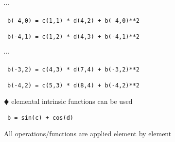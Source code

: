 \documentclass[slidestop,mathserif,compress,xcolor=svgnames]{beamer}
\begin{document}
\begin{frame}[allowframebreaks]
\begin{itemize}
\begin{enumerate}
      \item[] {\texttt{$\cdots$}}
      \item[] {\texttt{ b(-4,0) = c(1,1) * d(4,2) + b(-4,0)**2 }}
      \item[] {\texttt{ b(-4,1) = c(1,2) * d(4,3) + b(-4,1)**2 }}
      \item[] {\texttt{$\cdots$}}
      \item[] {\texttt{ b(-3,2) = c(4,3) * d(7,4) + b(-3,2)**2 }}
      \item[] {\texttt{ b(-4,2) = c(5,3) * d(8,4) + b(-4,2)**2 }}
      \item[]
      \item[$\vardiamond$] elemental intrinsic functions can be used
      \item[] {\texttt{ b = sin(c) + cos(d)}}
      \item[]
      \item[] All operations/functions are applied element by element
    \end{enumerate}
  \end{itemize}
\end{frame}
\end{document}
